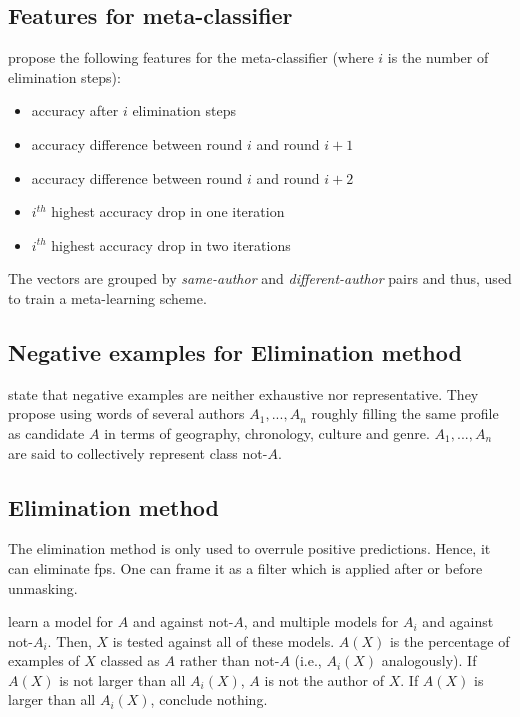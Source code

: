 \subsection{Features for meta-classifier}
\citet{koppel_authorship_2004} propose the following features for the meta-classifier 
(where $i$ is the number of elimination steps):
\begin{itemize}
    \item accuracy after $i$ elimination steps
    \item accuracy difference between round $i$ and round $i+1$
    \item accuracy difference between round $i$ and round $i+2$
    \item $i^{th}$ highest accuracy drop in one iteration
    \item $i^{th}$ highest accuracy drop in two iterations
\end{itemize}

The vectors are grouped by \emph{same-author} and \emph{different-author} pairs and thus, 
used to train a meta-learning scheme.

\subsection{Negative examples for Elimination method}
\citet{koppel_authorship_2004} state that negative examples are neither exhaustive nor representative.
They propose using words of several authors $A_1, ..., A_n$ roughly filling the same profile as candidate $A$ 
in terms of geography, chronology, culture and genre.
$A_1, ..., A_n$ are said to collectively represent class not-$A$.

\subsection{Elimination method}

The elimination method is only used to overrule positive predictions.
Hence, it can eliminate \acp{fp}.
One can frame it as a filter which is applied after or before unmasking.

\citet{koppel_authorship_2004} learn a model for $A$ and against not-$A$, 
and multiple models for $A_i$ and against not-$A_i$.
Then, $X$ is tested against all of these models.
$A(X)$ is the percentage of examples of $X$ classed as $A$ rather than not-$A$ 
(i.e., $A_i(X)$ analogously).
If $A(X)$ is not larger than all $A_i(X)$, $A$ is not the author of $X$.
If $A(X)$ is larger than all $A_i(X)$, conclude nothing.
